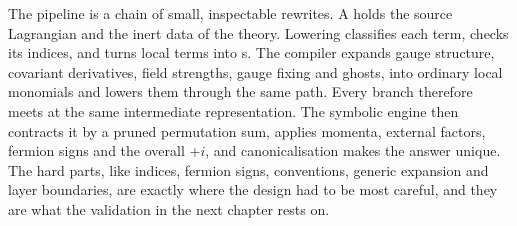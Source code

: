 The pipeline is a chain of small, inspectable rewrites. A  holds the source Lagrangian and the inert data of the theory. Lowering classifies each term, checks its indices, and turns local terms into s. The compiler expands gauge structure, covariant derivatives, field strengths, gauge fixing and ghosts, into ordinary local monomials and lowers them through the same path. Every branch therefore meets at the same intermediate representation. The symbolic engine then contracts it by a pruned permutation sum, applies momenta, external factors, fermion signs and the overall $+i$, and canonicalisation makes the answer unique. The hard parts, like indices, fermion signs, conventions, generic expansion and layer boundaries, are exactly where the design had to be most careful, and they are what the validation in the next chapter rests on.
